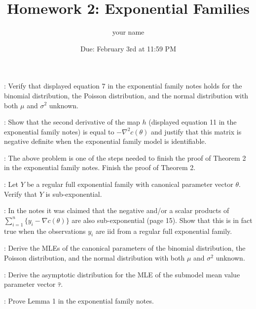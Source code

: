 \documentclass[12pt]{article}
\title{Homework 2: Exponential Families}
\author{your name}
\date{Due: February 3rd at 11:59 PM}
\begin{document}
\maketitle


: Verify that displayed equation 7 in the exponential family notes holds for the binomial distribution, the Poisson distribution, and the normal distribution with both $\mu$ and $\sigma^2$ unknown.

\vspace*{1cm}

: Show that the second derivative of the map $h$ (displayed equation 11 in the exponential family notes) is equal to $-\nabla^2 c(\theta)$ and justify that this matrix is negative definite when the exponential family model is identifiable.

\vspace*{1cm}

: The above problem is one of the steps needed to finish the proof of Theorem 2 in the exponential family notes. Finish the proof of Theorem 2.

\vspace*{1cm}

: Let $Y$ be a regular full exponential family with canonical parameter vector $\theta$. Verify that $Y$ is sub-exponential.

\vspace*{1cm}

: In the notes it was claimed that the negative and/or a scalar products of $\sum_{i=1}^n\{y_i - \nabla c(\theta)\}$ are also sub-exponential (page 15). Show that this is in fact true when the observations $y_i$ are iid from a regular full exponential family.

\vspace*{1cm}

: Derive the MLEs of the canonical parameters of the binomial distribution, the Poisson distribution, and the normal distribution with both $\mu$ and $\sigma^2$ unknown.

\vspace*{1cm}

: Derive the asymptotic distribution for the MLE of the submodel mean value parameter vector $\hat\tau$.

\vspace*{1cm}

: Prove Lemma 1 in the exponential family notes.

\vspace*{1cm}
\end{document}

